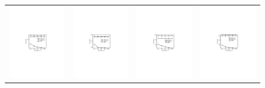 \begin{figure}[htb]
\hspace*{-.4cm}
\centering
\begin{tabular}{c c c c}
  \begin{minipage}{3.325cm}
  \includegraphics[width=3.725cm]{figures/flickrv1}
  \end{minipage}
  &
  \begin{minipage}{3.325cm}
  \includegraphics[width=3.725cm]{figures/dblpv1}
  \end{minipage}
  &
  \begin{minipage}{3.325cm}
  \includegraphics[width=3.725cm]{figures/tencentv1}
  \end{minipage}
  &
  \begin{minipage}{3.325cm}
  \includegraphics[width=3.725cm]{figures/dbpediav1}

\end{minipage}
\end{tabular}
\end{figure}
